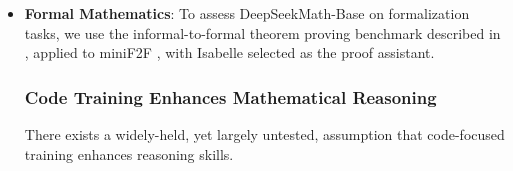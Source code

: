 \begin{itemize}[topsep=0pt]
\begin{itemize}[topsep=0pt]
\begin{itemize}[topsep=0pt]
improvements in how learning algorithms operate. \end{itemize}

\item \textbf{Formal Mathematics}: To assess DeepSeekMath-Base on formalization tasks, we use the informal-to-formal theorem proving benchmark described in \citep{dsp_proof}, applied to miniF2F \citep{minif2f}, with Isabelle \citep{isabelle} selected as the proof assistant. \subsubsection{Code Training Enhances Mathematical Reasoning}

There exists a widely-held, yet largely untested, assumption that code-focused training enhances reasoning skills. \end{itemize}


\end{itemize}
